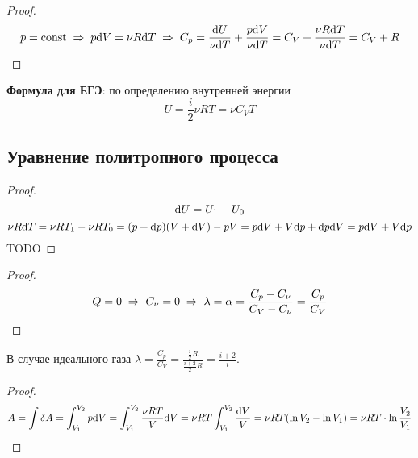 \begin{proof}
	\[p =\text{const} \;\Rightarrow\; p\text{d} V = \nu R \text{d} T \;\Rightarrow\; C_p = \frac{\text{d} U}{\nu \text{d} T} + \frac{p \text{d} V}{\nu \text{d} T} = C_V + \frac{\nu R \text{d} T}{\nu \text{d} T} = C_V + R\]
\end{proof}

\textbf{Формула для ЕГЭ}: по определению внутренней энергии
\[U = \frac{i}{2} \nu R T = \nu C_V T\]



\subsection{Уравнение политропного процесса}
\begin{proof}
	\[ \text{d} U = U_1 - U_0 \]
	\[ \nu R \text{d} T = \nu R T_1 - \nu R T_0 = (p + \text{d} p)(V + \text{d} V) - pV = p \text{d} V + V \text{d} p + \text{d} p \text{d} V = p \text{d} V + V \text{d} p\]
	TODO\par
\end{proof}

\begin{proof}
	\[Q = 0 \;\Rightarrow\; C_\nu = 0 \;\Rightarrow\; \lambda = \alpha = \frac{C_p - C_\nu}{C_V - C_\nu} = \frac{C_p}{C_V}\]
\end{proof}
В случае идеального газа $\displaystyle \lambda = \frac{C_p}{C_V} = \frac{\frac{i}{2}R}{\frac{i + 2}{2}R} = \frac{i + 2}{i}$.

\begin{proof}
	\[A = \int \delta A = 
	\int_{V_1}^{V_2}{p \text{d} V} = 
	\int_{V_1}^{V_2}{\frac{\nu R T}{V} \text{d} V} =
	\nu R T \int_{V_1}^{V_2}{\frac{\text{d} V}{V}} = 
	\nu R T (\ln{V_2} - \ln{V_1}) = \nu R T \cdot \ln{\frac{V_2}{V_1}} \]
\end{proof}